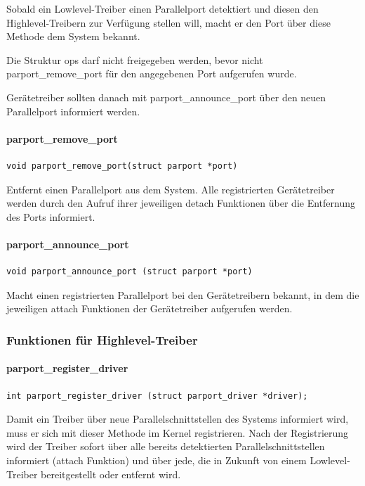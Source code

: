 \documentclass[a4paper,11pt]{article}
\begin{document}
Sobald ein Lowlevel-Treiber einen Parallelport detektiert und diesen den Highlevel-Treibern zur
Verfügung stellen will, macht er den Port über diese Methode dem System bekannt.

Die Struktur ops darf nicht freigegeben werden, bevor nicht parport\_remove\_port für den
angegebenen Port aufgerufen wurde.

Gerätetreiber sollten danach mit parport\_announce\_port über den neuen Parallelport informiert
werden.

\paragraph{parport\_remove\_port}
\begin{verbatim}
void parport_remove_port(struct parport *port)
\end{verbatim}

Entfernt einen Parallelport aus dem System. Alle registrierten Gerätetreiber werden durch den
Aufruf ihrer jeweiligen detach Funktionen über die Entfernung des Ports informiert.

\paragraph{parport\_announce\_port}
\begin{verbatim}
void parport_announce_port (struct parport *port)
\end{verbatim}

Macht einen registrierten Parallelport bei den Gerätetreibern bekannt, in dem die jeweiligen
attach Funktionen der Gerätetreiber aufgerufen werden.

\subsubsection{Funktionen für Highlevel-Treiber}

\paragraph{parport\_register\_driver}

\begin{verbatim}
int parport_register_driver (struct parport_driver *driver);
\end{verbatim}

Damit ein Treiber über neue Parallelschnittstellen des Systems informiert wird, muss er
sich mit dieser Methode im Kernel registrieren. Nach der Registrierung wird der Treiber
sofort über alle bereits detektierten Parallelschnittstellen informiert (attach Funktion)
und über jede, die in Zukunft von einem Lowlevel-Treiber bereitgestellt oder entfernt wird.
\end{document}
